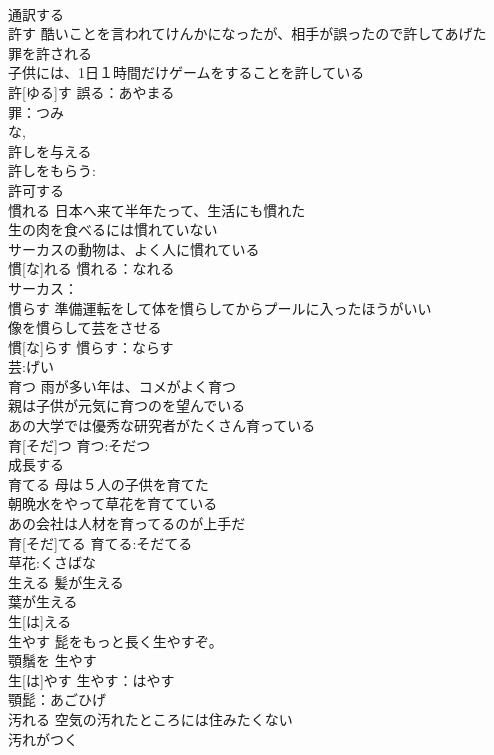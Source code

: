 \documentclass[8pt]{extreport}
\begin{document}
\begin{CJK}{UTF8}{min}
\\	通訳する 
\\	許す	酷いことを言われてけんかになったが、相手が誤ったので許してあげた 
\\	罪を許される 
\\	子供には、1日１時間だけゲームをすることを許している 
\\	許[ゆる]す			誤る：あやまる
\\	罪：つみ
\\	な, 
\\	許しを与える 
\\	許しをもらう: 
\\	許可する 
\\	慣れる	日本へ来て半年たって、生活にも慣れた 
\\	生の肉を食べるには慣れていない 
\\	サーカスの動物は、よく人に慣れている 
\\	慣[な]れる			慣れる：なれる
\\	サーカス：
\\	慣らす	準備運転をして体を慣らしてからプールに入ったほうがいい 
\\	像を慣らして芸をさせる 
\\	慣[な]らす			慣らす：ならす
\\	芸:げい
\\	育つ	雨が多い年は、コメがよく育つ 
\\	親は子供が元気に育つのを望んでいる 
\\	あの大学では優秀な研究者がたくさん育っている 
\\	育[そだ]つ			育つ:そだつ
\\	成長する 
\\	育てる	母は５人の子供を育てた 
\\	朝晩水をやって草花を育てている 
\\	あの会社は人材を育ってるのが上手だ 
\\	育[そだ]てる			育てる:そだてる
\\	草花:くさばな
\\	生える	髪が生える 
\\	葉が生える 
\\	生[は]える						
\\	生やす	髭をもっと長く生やすぞ。 
\\	顎鬚を 生やす 
\\	生[は]やす			生やす：はやす
\\	顎髭：あごひげ
\\	汚れる	空気の汚れたところには住みたくない 
\\	汚れがつく 

\end{CJK}
\end{document}
